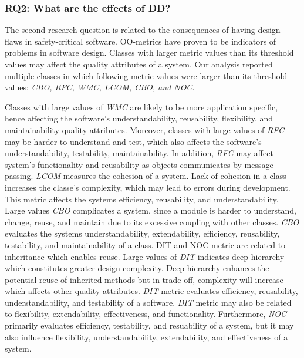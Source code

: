 

\subsubsection{RQ2: What are the effects of DD?} 
The second research question is related to the consequences of having design flaws in safety-critical software. OO-metrics have proven to be indicators of problems in software design. Classes with larger metric values than its threshold values may affect the quality attributes of a system. Our analysis reported multiple classes in which following metric values were larger than its threshold values; \textit{CBO, RFC, WMC, LCOM, CBO, and NOC}. 

Classes with large values of \textit{WMC} are likely to be more application specific, hence affecting the software's understandability, reusability, flexibility, and maintainability quality attributes\cite{rosenberg1998applying,bansiya2002hierarchical}. Moreover, classes with large values of \textit{RFC} may be harder to understand and test, which also affects the software's understandability, testability, maintainability\cite{rosenberg1998applying}. In addition, \textit{RFC} may affect system's functionality and reusability as objects communicates by message passing\cite{bansiya2002hierarchical}. \textit{LCOM} measures the cohesion of a system. Lack of cohesion in a class increases the classe's complexity, which may lead to errors during development. This metric affects the systems efficiency, reusability, and understandability\cite{rosenberg1998applying,bansiya2002hierarchical}. Large values \textit{CBO} complicates a system, since a module is harder to understand, change, reuse, and maintain due to its excessive coupling with other classes. \textit{CBO} evaluates the systems understandability, extendability, efficiency, reusability, testability, and maintainability of a class\cite{rosenberg1998applying,bansiya2002hierarchical}. DIT and NOC metric are related to inheritance which enables reuse. Large values of \textit{DIT} indicates deep hierarchy which constitutes greater design complexity. Deep hierarchy enhances the potential reuse of inherited methods but in trade-off, complexity will increase which affects other quality attributes. \textit{DIT} metric evaluates efficiency, reusability, understandability, and testability\cite{rosenberg1998applying} of a software. \textit{DIT} metric may also be related to flexibility, extendability, effectiveness, and functionality\cite{bansiya2002hierarchical}. Furthermore, \textit{NOC} primarily evaluates efficiency, testability, and resuability of a system\cite{rosenberg1998applying}, but it may also influence flexibility, understandability, extendability, and effectiveness of a system\cite{bansiya2002hierarchical}.

